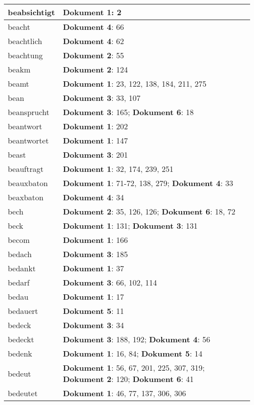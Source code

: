 \documentclass[a5paper]{article}
\begin{document}
\begin{longtable}[l]{|l|p{3in}|}
\hline
beabsichtigt & \textbf{Dokument 1}: 2 \\
\hline
beacht & \textbf{Dokument 4}: 66 \\
\hline
beachtlich & \textbf{Dokument 4}: 62 \\
\hline
beachtung & \textbf{Dokument 2}: 55 \\
\hline
beakm & \textbf{Dokument 2}: 124 \\
\hline
beamt & \textbf{Dokument 1}: 23, 122, 138, 184, 211, 275 \\
\hline
bean & \textbf{Dokument 3}: 33, 107 \\
\hline
beansprucht & \textbf{Dokument 3}: 165; \textbf{Dokument 6}: 18 \\
\hline
beantwort & \textbf{Dokument 1}: 202 \\
\hline
beantwortet & \textbf{Dokument 1}: 147 \\
\hline
beast & \textbf{Dokument 3}: 201 \\
\hline
beauftragt & \textbf{Dokument 1}: 32, 174, 239, 251 \\
\hline
beauxbaton & \textbf{Dokument 1}: 71-72, 138, 279; \textbf{Dokument 4}: 33 \\
\hline
beaxbaton & \textbf{Dokument 4}: 34 \\
\hline
bech & \textbf{Dokument 2}: 35, 126, 126; \textbf{Dokument 6}: 18, 72 \\
\hline
beck & \textbf{Dokument 1}: 131; \textbf{Dokument 3}: 131 \\
\hline
becom & \textbf{Dokument 1}: 166 \\
\hline
bedach & \textbf{Dokument 3}: 185 \\
\hline
bedankt & \textbf{Dokument 1}: 37 \\
\hline
bedarf & \textbf{Dokument 3}: 66, 102, 114 \\
\hline
bedau & \textbf{Dokument 1}: 17 \\
\hline
bedauert & \textbf{Dokument 5}: 11 \\
\hline
bedeck & \textbf{Dokument 3}: 34 \\
\hline
bedeckt & \textbf{Dokument 3}: 188, 192; \textbf{Dokument 4}: 56 \\
\hline
bedenk & \textbf{Dokument 1}: 16, 84; \textbf{Dokument 5}: 14 \\
\hline
bedeut & \textbf{Dokument 1}: 56, 67, 201, 225, 307, 319; \textbf{Dokument 2}: 120; \textbf{Dokument 6}: 41 \\
\hline
bedeutet & \textbf{Dokument 1}: 46, 77, 137, 306, 306 \\

\end{longtable}
\end{document}
